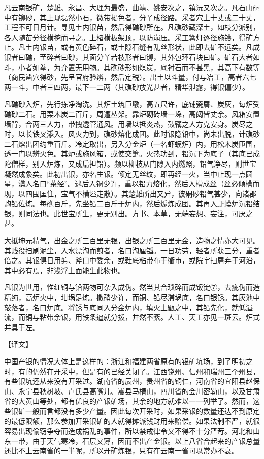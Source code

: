 \documentclass[12pt,UTF8]{ctexbook}
\begin{document}
凡云南银矿，楚雄、永昌、大理为最盛，曲靖、姚安次之，镇沅又次之。凡石山硐中有铆砂，其上现磊然小石，微带褐色者，分丫成径路。采者穴土十丈或二十丈，工程不可日月计。寻见土内银苗，然后得礁砂所在。凡礁砂藏深土，如枝分派别，各人随苗分径横挖而寻之。上楮横板架顶，以防崩压。采工篝灯逐径施镬，得矿方止。凡土内银苗，或有黄色碎石，或土隙石缝有乱丝形状，此即去矿不远矣。凡成银者曰礁，至碎者曰砂，其面分丫若枝形者曰铆，其外包环石块曰矿。矿石大者如斗，小者如拳，为弃置无用物。其礁砂形如煤炭，底衬石而不甚黑，其高下有数等（商民凿穴得砂，先呈官府验辨，然后定税）。出土以斗量，付与冶工，高者六七两一斗，中者三四两，最下一二两（其礁砂放光甚者，精华泄露，得银偏少）。

凡礁砂入炉，先行拣净淘洗。其炉土筑巨墩，高五尺许，底铺瓷屑、炭灰，每炉受礁砂二石。用栗木炭二百斤，周遭丛架。靠炉砌砖墙一垛，高阔皆丈余。风箱安置墙背，合两三人力，带拽透管通风。用墙以抵炎热，鼓鞲之人方克安身。炭尽之时，以长铁叉添入。风火力到，礁砂熔化成团。此时银隐铅中，尚未出脱，计礁砂二石熔出团约重百斤。冷定取出，另入分金炉（一名虾蟆炉）内，用松木炭匝围，透一门以辨火色。其炉或施风箱，或使交箑。火热功到，铅沉下为底子（其底已成陀僧样，别入炉炼，又成扁担铅）。频以柳枝从门隙入内燃照，铅气净尽，则世宝凝然成象矣。此初出银，亦名生银。倾定无丝纹，即再经一火，当中止现一点圆星，滇人名曰“茶经”。逮后入铜少许，重以铅力熔化，然后入槽成丝（丝必倾槽而现，以四围匡住，宝气不横溢走散）。其楚雄所出又异，彼硐砂铅气甚少，向诸郡购铅佐炼。每礁百斤，先坐铅二百斤于炉内，然后煽炼成团。其再入虾蟆炉沉铅结银，则同法也。此世宝所生，更无别出。方书、本草，无端妄想、妄注，可厌之甚。

大抵坤元精气，出金之所三百里无银，出银之所三百里无金，造物之情亦大可见。其贱役扫刷泥尘，入水漂淘而煎者，名曰淘厘锱。一日功劳，轻者所获三分，重者倍之。其银俱日用剪、斧口中委余，或鞋底粘带布于衢市，或院宇扫屑弃于河沿，其中必有焉，非浅浮土面能生此物也。

凡银为世用，惟红铜与铅两物可杂入成伪。然当其合琐碎而成钣锭⑦，去疵伪而造精纯，高炉火中，坩埚足炼。撒硝少许，而铜、铅尽滞埚底，名曰银锈。其灰池中敲落者，名曰炉底。将锈与底同入分金炉内，填火土甑之中，其铅先化，就低溢流，而铜与粘带余银，用铁条逼就分拨，井然不紊。人工、天工亦见一斑云。炉式并具于左。

【译文】

中国产银的情况大体上是这样的：浙江和福建两省原有的银矿坑场，到了明初之时，有的仍然在开采中，但是有的已经关闭了。江西饶州、信州和瑞州三个州县，有些银坑还从来没有开采过。湖南省的辰州，贵州省的铜仁，河南省的宜阳县赵保山、永宁县秋树坡、卢氏县高嘴儿、嵩县马槽山，四川省的会川密勒山，以及甘肃省的大黄山等处，都有优良的产银矿场，其余的地方就难以一一列举了。然而，这些银矿一般而言都没有多少产量。因此每次开采时，如果采银的数量还达不到原定的最低限额，那么参加开采银矿的人就得摊派钱财用来赔偿。如果法制不严，就很容易出现偷窃争夺而造成祸乱的事件，所以禁戒律令又不得不十分严苛。河北和山东一带，由于天气寒冷，石层又薄，因而不出产金银。以上八省合起来的产银总量还比不上云南省的一半呢，所以开矿炼银，只有在云南一省可以常办不衰。
\end{document}
